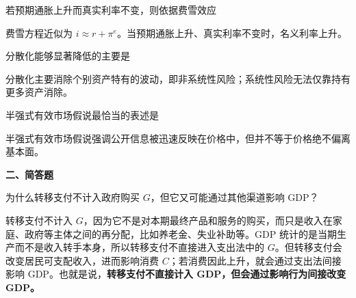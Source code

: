 \begin{question}
若预期通胀上升而真实利率不变，则依据费雪效应
\begin{choiceoptions}[2]
\end{choiceoptions}
\begin{solution}
费雪方程近似为 $i\approx r+\pi^e$。当预期通胀上升、真实利率不变时，名义利率上升。
\end{solution}
\end{question}

\begin{question}
分散化能够显著降低的主要是
\begin{choiceoptions}[2]
\end{choiceoptions}
\begin{solution}
分散化主要消除个别资产特有的波动，即非系统性风险；系统性风险无法仅靠持有更多资产消除。
\end{solution}
\end{question}

\begin{question}
半强式有效市场假说最恰当的表述是
\begin{choiceoptions}[2]
\end{choiceoptions}
\begin{solution}
半强式有效市场假说强调公开信息被迅速反映在价格中，但并不等于价格绝不偏离基本面。
\end{solution}
\end{question}

\textbf{二、简答题}

\begin{question}
为什么转移支付不计入政府购买 $G$，但它又可能通过其他渠道影响 GDP？

\begin{solution}
转移支付不计入 $G$，因为它不是对本期最终产品和服务的购买，而只是收入在家庭、政府等主体之间的再分配，比如养老金、失业补助等。GDP 统计的是当期生产而不是收入转手本身，所以转移支付不直接进入支出法中的 $G$。但转移支付会改变居民可支配收入，进而影响消费 $C$；若消费因此上升，就会通过支出法间接影响 GDP。也就是说，\textbf{转移支付不直接计入 GDP，但会通过影响行为间接改变 GDP。}
\end{solution}
\end{question}

